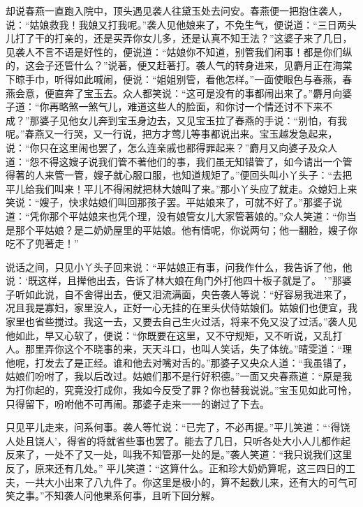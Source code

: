 \begin{parag}
    却说春燕一直跑入院中，顶头遇见袭人往黛玉处去问安。春燕便一把抱住袭人，说：“姑娘救我！我娘又打我呢。”袭人见他娘来了，不免生气，便说道：“三日两头儿打了干的打亲的，还是买弄你女儿多，还是认真不知王法？”这婆子来了几日，见袭人不言不语是好性的，便说道：“姑娘你不知道，别管我们闲事！都是你们纵的，这会子还管什么？”说著，便又赶著打。袭人气的转身进来，见麝月正在海棠下晾手巾，听得如此喊闹，便说：“姐姐别管，看他怎样。”一面使眼色与春燕，春燕会意，便直奔了宝玉去。众人都笑说：“这可是没有的事都闹出来了。”麝月向婆子道：“你再略煞一煞气儿，难道这些人的脸面，和你讨一个情还讨不下来不成？”那婆子见他女儿奔到宝玉身边去，又见宝玉拉了春燕的手说：“别怕，有我呢。”春燕又一行哭，又一行说，把方才莺儿等事都说出来。宝玉越发急起来，说：“你只在这里闹也罢了，怎么连亲戚也都得罪起来？”麝月又向婆子及众人道：“怨不得这嫂子说我们管不著他们的事，我们虽无知错管了，如今请出一个管得著的人来管一管，嫂子就心服口服，也知道规矩了。”便回头叫小丫头子：“去把平儿给我们叫来！平儿不得闲就把林大娘叫了来。”那小丫头应了就走。众媳妇上来笑说：“嫂子，快求姑娘们叫回那孩子罢。平姑娘来了，可就不好了。”那婆子说道：“凭你那个平姑娘来也凭个理，没有娘管女儿大家管著娘的。”众人笑道：“你当是那个平姑娘？是二奶奶屋里的平姑娘。他有情呢，你说两句；他一翻脸，嫂子你吃不了兜著走！”
\end{parag}


\begin{parag}
    说话之间，只见小丫头子回来说：“平姑娘正有事，问我作什么，我告诉了他，他说：‘既这样，且撵他出去，告诉了林大娘在角门外打他四十板子就是了。 ’”那婆子听如此说，自不舍得出去，便又泪流满面，央告袭人等说：“好容易我进来了，况且我是寡妇，家里没人，正好一心无挂的在里头伏侍姑娘们。姑娘们也便宜，我家里也省些搅过。我这一去，又要去自己生火过活，将来不免又没了过活。”袭人见他如此，早又心软了，便说：“你既要在这里，又不守规矩，又不听说，又乱打人。那里弄你这个不晓事的来，天天斗口，也叫人笑话，失了体统。”晴雯道：“理他呢，打发去了是正经。谁和他去对嘴对舌的。”那婆子又央众人道：“我虽错了，姑娘们吩咐了，我以后改过。姑娘们那不是行好积德。”一面又央春燕道：“原是我为打你起的，究竟没打成你，我如今反受了罪？你也替我说说。”宝玉见如此可怜，只得留下，吩咐他不可再闹。那婆子走来一一的谢过了下去。
\end{parag}


\begin{parag}
    只见平儿走来，问系何事。袭人等忙说：“已完了，不必再提。”平儿笑道：“‘得饶人处且饶人’，得省的将就省些事也罢了。能去了几日，只听各处大小人儿都作起反来了，一处不了又一处，叫我不知管那一处的是。”袭人笑道：“我只说我们这里反了，原来还有几处。” 平儿笑道：“这算什么。正和珍大奶奶算呢，这三四日的工夫，一共大小出来了八九件了。你这里是极小的，算不起数儿来，还有大的可气可笑之事。”不知袭人问他果系何事，且听下回分解。
\end{parag}
